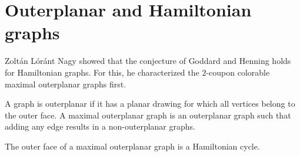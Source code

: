 \section{Outerplanar and Hamiltonian graphs}
Zoltán Lóránt Nagy \cite{outerplanar} showed that the conjecture of Goddard and Henning holds for
Hamiltonian graphs. For this, he characterized the $2$-coupon colorable
maximal outerplanar graphs first.

\begin{definition}
   A graph is outerplanar if it has a planar drawing for which all vertices
   belong to the outer face. A maximal outerplanar graph is an outerplanar graph
   such that adding any edge results in a non-outerplanar graphs.
\end{definition}
\begin{remark}
  The outer face of a maximal outerplanar graph is a Hamiltonian cycle.
\end{remark}

